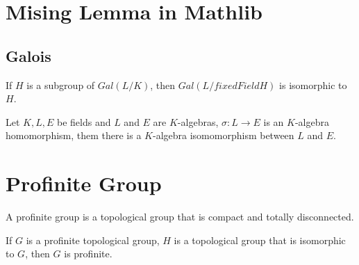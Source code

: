 %

\chapter{Mising Lemma in Mathlib}

\section{Galois}

\begin{lemma}
	\leanok
	If $H$ is a subgroup of $Gal(L/K)$, then $Gal(L / fixedField H)$ is isomorphic to $H$.
\end{lemma}

\begin{lemma}
	\leanok
	Let $ K, L, E $ be fields and $ L $ and $ E $ are $ K $-algebras, $\sigma : L \to E $ is an $ K $-algebra homomorphism, them there is a $ K $-algebra isomomorphism between $ L $ and $ E $.
\end{lemma}




\chapter{Profinite Group}

\begin{definition}
	\leanok
	A profinite group is a topological group that is compact and totally disconnected.
\end{definition}

\begin{lemma}
	\leanok
	If $G$ is a profinite topological group, $H$ is a topological group that is isomorphic to $G$, then $G$ is profinite.
\end{lemma}

